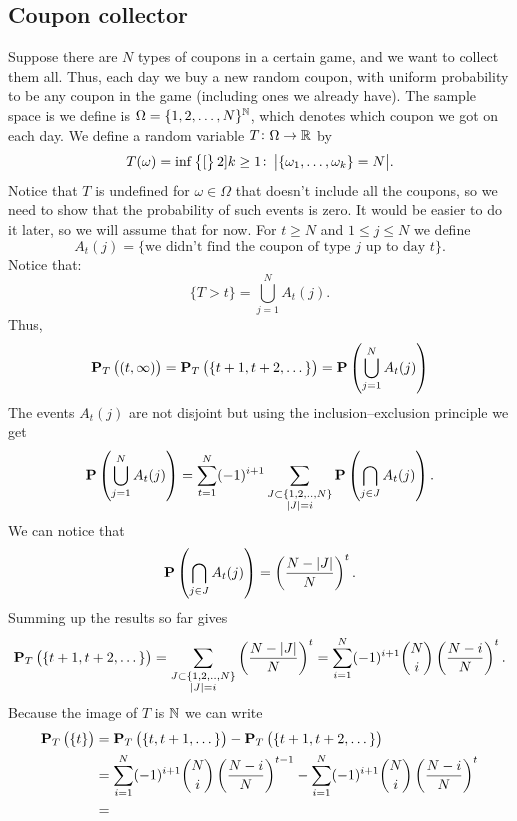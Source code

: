 \documentclass[11pt,a4paper]{article}
\begin{document}
\subsection{Coupon collector}

\begin{example}
  Suppose there are $N$ types of coupons in a certain game,
  and we want to collect them all. 
  Thus, each day we buy a new random coupon, with uniform probability
  to be any coupon in the game (including ones we already have).
  The sample space is we define is $\Omega = \{1,2,\dots,N\}^{\mathbb{N}}$,
  which denotes which coupon we got on each day.
  We define a random variable $T \colon \Omega \to \mathbb{R}$ by
  \[
    T(\omega) = 
    \inf\left\{[\right\}2]{k \geq 1 \colon \left\lvert\left\{\omega_1,\dots,\omega_k\right\} = N\right\rvert}.
  \]
  Notice that $T$ is undefined for $\omega \in \Omega$ that doesn't include
  all the coupons, so we need to show that the probability of such events
  is zero. It would be easier to do it later, so we will assume that for
  now. For $t \geq N$ and $1 \le j \le N$ we define
  \[
    A_t(j) = \{\text{we didn't find the coupon of type $j$ up to day $t$}\}.
  \]
  Notice that:
  \[
    \{T > t\} = \bigcup_{j=1}^{N} A_t(j).
  \]
  Thus,
  \[
    \mathbf{P}_T\left((t,\infty)\right) =
    \mathbf{P}_T\left(\{t + 1, t + 2, \dots\}\right) =
    \mathbf{P}\left(\bigcup_{j=1}^{N} A_t(j) \right)
  \]
  The events $A_t(j)$ are not disjoint but using the inclusion--exclusion
  principle we get
  \[
    \mathbf{P}\left(\bigcup_{j=1}^{N} A_t(j) \right) =
    \sum_{t=1}^{N}(-1)^{i+1} 
    \sum_{\substack{J\subset\{1,2,..,N\} \\ \left\lvert J\right\rvert = i}}
    \mathbf{P}\left(\bigcap_{j\in J}A_{t}(j)\right).
  \]
  We can notice that
  \[
    \mathbf{P}\left(\bigcap_{j\in J}A_{t}(j)\right) = 
    \left(\frac{N - \left\lvert J\right\rvert}{N}\right)^t.
  \]
  Summing up the results so far gives
  \[
    \mathbf{P}_T\left(\{t + 1, t + 2, \dots\}\right) =
    \sum_{\substack{J\subset\{1,2,..,N\} \\ \left\lvert J\right\rvert = i}}
    \left(\frac{N - \left\lvert J\right\rvert}{N}\right)^t =
    \sum_{i=1}^{N} (-1)^{i+1} \binom{N}{i} \left(\frac{N-i}{N}\right)^{t}.
  \]
  Because the image of $T$ is $\mathbb{N}$ we can write
  \begin{align*}
    \Prob_T\left(\{t\}\right) &=
    \Prob_T\left(\{t, t + 1, \dots\}\right) -
    \Prob_T\left(\{t + 1, t + 2, \dots\}\right) \\ &=
    \sum_{i=1}^{N}(-1)^{i+1}\binom{N}{i}\left(\frac{N-i}{N}\right)^{t-1} -
    \sum_{i=1}^{N}(-1)^{i+1}\binom{N}{i}\left(\frac{N-i}{N}\right)^{t} \\ &=

\end{align*}
\end{example}
\end{document}
